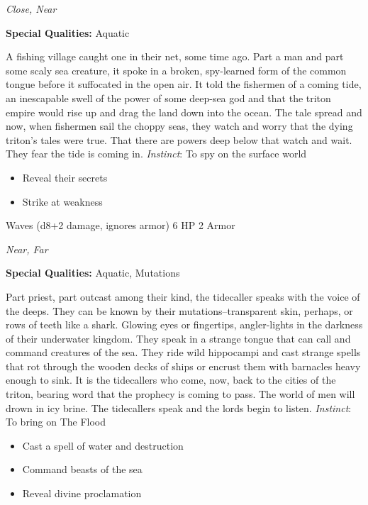 \emph{Close, Near}

\textbf{Special Qualities:}
Aquatic

\HRule
A fishing village caught one in their net, some time ago. Part a man and part some scaly sea creature, it spoke in a broken, spy-learned form of the common tongue before it suffocated in the open air. It told the fishermen of a coming tide, an inescapable swell of the power of some deep-sea god and that the triton empire would rise up and drag the land down into the ocean. The tale spread and now, when fishermen sail the choppy seas, they watch and worry that the dying triton's tales were true. That there are powers deep below that watch and wait. They fear the tide is coming in. \emph{Instinct}: To spy on the surface world
\begin{itemize}
\item Reveal their secrets
\item Strike at weakness
\end{itemize}

\HRule
{}

Waves (d8+2 damage, ignores armor)\hspace*{\fill} 6 HP 2 Armor

\emph{Near, Far}

\textbf{Special Qualities:}
Aquatic, Mutations

\HRule
Part priest, part outcast among their kind, the tidecaller speaks with the voice of the deeps. They can be known by their mutations--transparent skin, perhaps, or rows of teeth like a shark. Glowing eyes or fingertips, angler-lights in the darkness of their underwater kingdom. They speak in a strange tongue that can call and command creatures of the sea. They ride wild hippocampi and cast strange spells that rot through the wooden decks of ships or encrust them with barnacles heavy enough to sink. It is the tidecallers who come, now, back to the cities of the triton, bearing word that the prophecy is coming to pass. The world of men will drown in icy brine. The tidecallers speak and the lords begin to listen. \emph{Instinct}: To bring on The Flood
\begin{itemize}
\item Cast a spell of water and destruction
\item Command beasts of the sea
\item Reveal divine proclamation
\end{itemize}
\newpage
\HRule
{}

